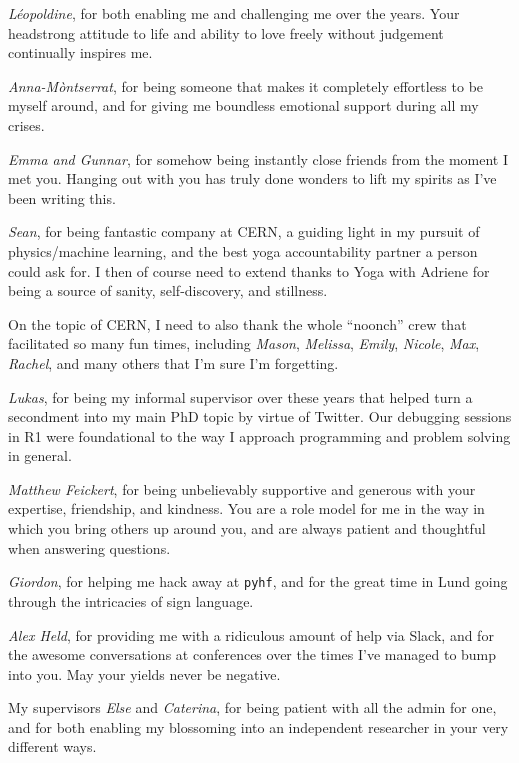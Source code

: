 \documentclass[
  11pt,
  numbers=noendperiod]{book}
\begin{document}
\textit{Léopoldine}, for both enabling me and challenging me over the years. Your headstrong attitude to life and ability to love freely without judgement continually inspires me.

\textit{Anna-Mòntserrat}, for being someone that makes it completely effortless to be myself around, and for giving me boundless emotional support during all my crises.

\textit{Emma and Gunnar}, for somehow being instantly close friends from the moment I met you. Hanging out with you has truly done wonders to lift my spirits as I've been writing this.

\textit{Sean}, for being fantastic company at CERN, a guiding light in my pursuit of physics/machine learning, and the best yoga accountability partner a person could ask for. I then of course need to extend thanks to Yoga with Adriene for being a source of sanity, self-discovery, and stillness. 

On the topic of CERN, I need to also thank the whole ``noonch'' crew that facilitated so many fun times, including \textit{Mason}, \textit{Melissa}, \textit{Emily}, \textit{Nicole}, \textit{Max}, \textit{Rachel}, and many others that I'm sure I'm forgetting.

\textit{Lukas}, for being my informal supervisor over these years that helped turn a secondment into my main PhD topic by virtue of Twitter. Our debugging sessions in R1 were foundational to the way I approach programming and problem solving in general.

\textit{Matthew Feickert}, for being unbelievably supportive and generous with your expertise, friendship, and kindness. You are a role model for me in the way in which you bring others up around you, and are always patient and thoughtful when answering questions.

\textit{Giordon}, for helping me hack away at \texttt{pyhf}, and for the great time in Lund going through the intricacies of sign language.

\textit{Alex Held}, for providing me with a ridiculous amount of help via Slack, and for the awesome conversations at conferences over the times I've managed to bump into you. May your yields never be negative.

My supervisors \textit{Else} and \textit{Caterina}, for being patient with all the admin for one, and for both enabling my blossoming into an independent researcher in your very different ways.
\end{document}
